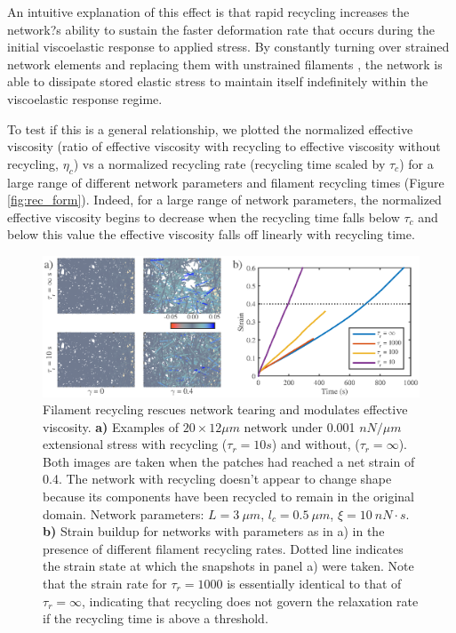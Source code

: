 \documentclass[10pt,letterpaper]{article}
\begin{document}
An intuitive explanation of this effect is that rapid recycling increases the network?s ability to sustain the faster deformation rate that occurs during the initial viscoelastic response to applied stress. By constantly turning over strained network elements and replacing them with unstrained filaments , the network is able to dissipate stored elastic stress to maintain itself indefinitely within the viscoelastic response regime.  


To test if this is a general relationship, we plotted the normalized effective viscosity (ratio of effective viscosity with recycling to effective viscosity without recycling, $\eta_c$) vs a normalized recycling rate (recycling time scaled by $\tau_c$) for a large range of different network parameters and filament recycling times (Figure \ref{fig:rec_form}). Indeed, for a large range of network parameters, the normalized effective viscosity begins to decrease when the recycling time falls below $\tau_c$ and below this value the effective viscosity falls off linearly with recycling time.


\begin{figure}[h!]
\centering
\includegraphics[width=\hsize]{figures/figure5a}
\caption{\label{fig:passive_rec}  Filament recycling rescues network tearing and modulates effective viscosity.  \textbf{a)} Examples of $20 \times 12 \mu m$ network under 0.001 $nN/\mu m$ extensional stress with recycling ($\tau_r=10 s$) and without, ($\tau_r=\infty$).  Both images are taken when the patches had reached a net strain of 0.4.  The network with recycling doesn't appear to change shape because its components have been recycled to remain in the original domain.  Network parameters: $L=3\: \mu m$, $l_c=0.5\: \mu m$, $\xi=10\: nN\cdot s$.  \textbf{b)}  Strain buildup for networks with parameters as in a) in the presence of different filament recycling rates. Dotted line indicates the strain state at which the snapshots in panel a) were taken.  Note that the strain rate for $\tau_r=1000$ is essentially identical to that of $\tau_r=\infty$, indicating that recycling does not govern the relaxation rate if the recycling time is above a threshold.}
\end{figure}
\end{document}
